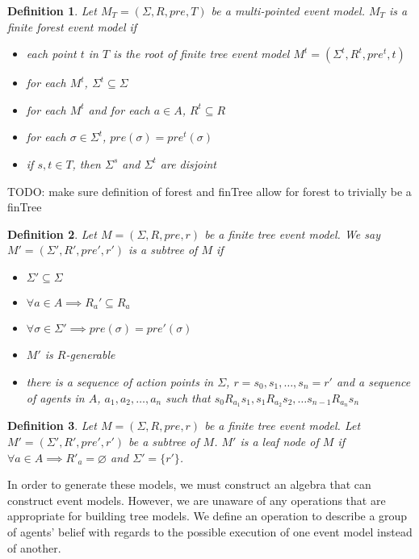 \documentclass[12pt, a4paper, titlepage]{scrartcl}
\newtheorem{defn}{Definition}[section]
\numberwithin{equation}{section}
\begin{document}
\begin{defn} \label{forest}
Let $M_T = (\Sigma, R, pre, T)$ be a multi-pointed event model.
$M_T$ is a finite forest event model if
\begin{itemize}
	\item each point $t$ in $T$ is the root of finite tree event model $M^t = (\Sigma^t, R^t,
	pre^t, t)$
	\item for each $M^t$, $\Sigma^t \subseteq \Sigma$
	\item for each $M^t$ and for each $a \in A$, $R^t \subseteq R$
	\item for each $\sigma \in \Sigma^t$, $pre(\sigma) = pre^t(\sigma)$
	\item if $s, t \in T$, then $\Sigma^s$ and $\Sigma^t$ are disjoint
\end{itemize}
\end{defn}

TODO: make sure definition of forest and finTree allow for forest to trivially be a finTree

\begin{defn} \label{subtree}
Let $M = (\Sigma, R, pre, r)$ be a finite tree event model.
We say $M' = (\Sigma', R', pre', r')$ is a subtree of $M$ if
\begin{itemize}
	\item $\Sigma' \subseteq \Sigma$
	\item $\forall a \in A \implies R_a' \subseteq R_a$
	\item $\forall \sigma \in \Sigma' \implies pre(\sigma) = pre'(\sigma) $
	\item $M'$ is $R$-generable
	\item there is a sequence of action points in $\Sigma$, $r = s_0, s_1, \ldots, s_n = r'$ and a
	sequence of agents in $A$, $a_1, a_2, \ldots, a_n$ such that $s_0 R_{a_1} s_1, s_1 R_{a_2} s_2,
	\ldots s_{n-1} R_{a_n} s_n$
\end{itemize}
\end{defn}

\begin{defn} \label{leaf}
Let $M = (\Sigma, R, pre, r)$ be a finite tree event model.
Let $M' = (\Sigma', R', pre', r')$ be a subtree of $M$.
$M'$ is a leaf node of $M$ if $\forall a \in A \implies R'_a = \varnothing$ and $\Sigma' = \{ r'\}$.
\end{defn}

In order to generate these models, we must construct an algebra that can construct event models.
However, we are unaware of any operations that are appropriate for building tree models.
We define an operation to describe a group of agents' belief with regards to the possible execution
of one event model instead of another.
\end{document}
